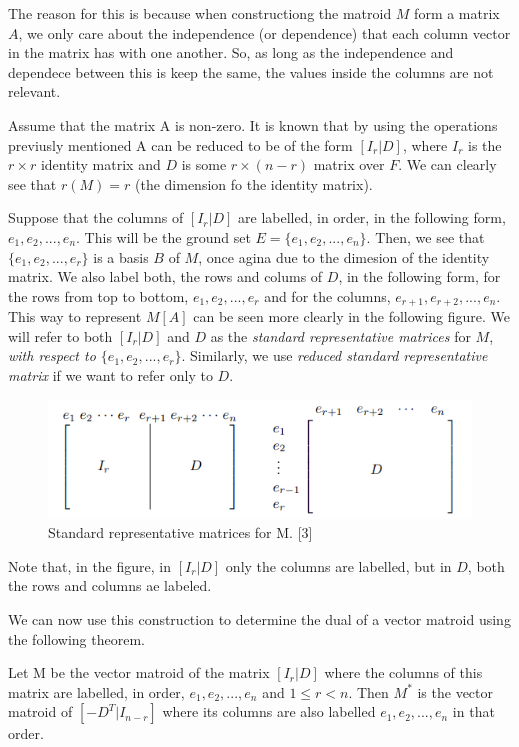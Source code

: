 The reason for this is because when constructiong the matroid $M$ form a matrix $A$, we only care about the independence (or dependence) that each column vector in the matrix has with one another. So, as long as the independence and dependece between this is keep the same, the values inside the columns are not relevant.

Assume that the matrix A is non-zero. It is known that by using the operations previusly mentioned A can be reduced to be of the form $[I_r|D]$, where $I_r$ is the $r \times r$ identity matrix and $D$ is some $r \times (n-r)$ matrix over $F$. We can clearly see that $r(M)=r$ (the dimension fo the identity matrix). 

Suppose that the columns of $[I_r|D]$ are labelled, in order, in the following form, $e_1, e_2,...,e_n$. This will be the ground set $E=\{e_1, e_2,...,e_n\}$. Then, we see that $\{e_1, e_2,...,e_r\}$ is a basis $B$ of $M$, once agina due to the dimesion of the identity matrix. We also label both, the rows and colums of $D$, in the following form, for the rows from top to bottom, $e_1, e_2,...,e_r$ and for the columns,  $e_{r+1}, e_{r+2},...,e_n$. This way to represent $M[A]$ can be seen more clearly in the following figure. We will refer to both $[I_r|D]$ and $D$ as the \textit{standard representative matrices} for $M$, \textit{with respect to $\{e_1, e_2,...,e_r\}$}. Similarly, we use \textit{reduced standard representative matrix} if we want to refer only to $D$.

\begin{figure}[H]
    \centering
    \includegraphics{Sections/SRF.png}
    \caption{Standard representative matrices for M. [3]}
    \label{fig:enter-label}
\end{figure}
Note that, in the figure, in $[I_r|D]$ only the columns are labelled, but in $D$, both the rows and columns ae labeled.

We can now use this construction to determine the dual of a vector matroid using the following theorem.

\begin{theorem}
    Let M be the vector matroid of the matrix $[I_r|D]$ where the columns of this matrix are labelled, in order, $e_1, e_2,...,e_n$ and $1\leq r< n$. Then $M^*$ is the vector matroid of $[-D^T|I_{n-r}]$ where its columns are also labelled $e_1, e_2,...,e_n$ in that order.
\end{theorem}


